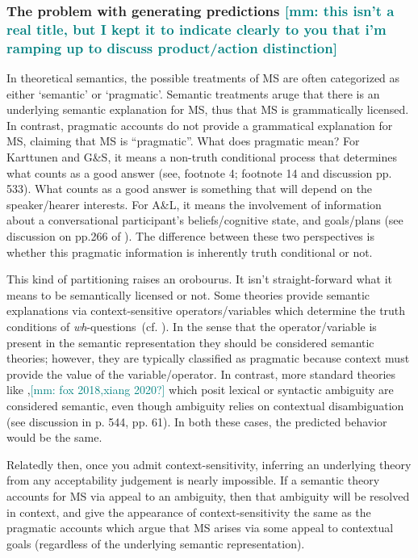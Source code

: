 \documentclass[12pt,letterpaper,table,svgnames,dvipsnames]{article}
\newcommand{\mm}[1]{\textcolor{teal}{[mm: #1]}}
\newcommand{\whqs}{\emph{wh}-questions~}
\begin{document}
\subsubsection{The problem with generating predictions \mm{this isn't a real title, but I kept it to indicate clearly to you that i'm ramping up to discuss product/action distinction}}
In theoretical semantics, the possible treatments of MS are often categorized as either `semantic' or `pragmatic'. Semantic treatments aruge that there is an underlying semantic explanation for MS, thus that MS is grammatically licensed. In contrast, pragmatic accounts do not provide a grammatical explanation for MS, claiming that MS is ``pragmatic''. What does pragmatic mean? For Karttunen and G\&S, it means a non-truth conditional process that determines what counts as a good answer (see, \cite{karttunen1977} footnote 4; \cite{groenstok1984} footnote 14 and discussion pp. 533). What counts as a good answer is something that will depend on the speaker/hearer interests. For A\&L, it means the involvement of information about a conversational participant's beliefs/cognitive state, and goals/plans (see discussion on pp.266 of ). The difference between these two perspectives is whether this pragmatic information is inherently truth conditional or not. 

This kind of partitioning raises an orobourus. It isn't straight-forward what it means to be semantically licensed or not. Some theories provide semantic explanations via context-sensitive operators/variables which determine the truth conditions of \whqs (cf. \cite{lahiri2002,vanrooij2003,vanrooij2004}). In the sense that the operator/variable is present in the semantic representation they should be considered semantic theories; however, they are typically classified as pragmatic because context must provide the value of the variable/operator. In contrast, more standard theories like \cite{beckrull1999,george2011,fox2014,nicolae2014,xiang2016},\mm{fox 2018,xiang 2020?} which posit lexical or syntactic ambiguity are considered semantic, even though ambiguity relies on contextual disambiguation (see discussion in  p. 544,  pp. 61). In both these cases, the predicted behavior would be the same.

Relatedly then, once you admit context-sensitivity, inferring an underlying theory from any acceptability judgement is nearly impossible. If a semantic theory accounts for MS via appeal to an ambiguity, then that ambiguity will be resolved in context, and give the appearance of context-sensitivity the same as the pragmatic accounts which argue that MS arises via some appeal to contextual goals (regardless of the underlying semantic representation). 
\end{document}
